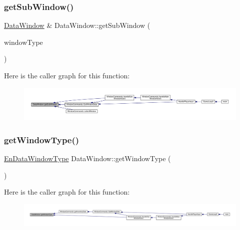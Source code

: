 \subsubsection{\texorpdfstring{get\+Sub\+Window()}{getSubWindow()}}
{\footnotesize\ttfamily \mbox{\hyperlink{class_data_window}{Data\+Window}} \& Data\+Window\+::get\+Sub\+Window (\begin{DoxyParamCaption}\item[{\mbox{\hyperlink{_data_window_8hpp_a3c1e0c6fe947fdbea7502497b27cf44d}{En\+Data\+Window\+Type}}}]{window\+Type }\end{DoxyParamCaption})}

Here is the caller graph for this function\+:
\nopagebreak
\begin{figure}[H]
\begin{center}
\leavevmode
\includegraphics[width=350pt]{d1/def/class_data_window_ab3ad6b28f3a4c54f692d623b4af48779_icgraph}
\end{center}
\end{figure}
\mbox{\label{class_data_window_a84545c27ad784513eb4f830d4aeda82a}} 
\subsubsection{\texorpdfstring{get\+Window\+Type()}{getWindowType()}}
{\footnotesize\ttfamily \mbox{\hyperlink{_data_window_8hpp_a3c1e0c6fe947fdbea7502497b27cf44d}{En\+Data\+Window\+Type}} Data\+Window\+::get\+Window\+Type (\begin{DoxyParamCaption}{ }\end{DoxyParamCaption})}

Here is the caller graph for this function\+:
\nopagebreak
\begin{figure}[H]
\begin{center}
\leavevmode
\includegraphics[width=350pt]{d1/def/class_data_window_a84545c27ad784513eb4f830d4aeda82a_icgraph}
\end{center}
\end{figure}
\mbox{\label{class_data_window_afd440dc420c7fdef23a1a52f0f1b40f1}} 

